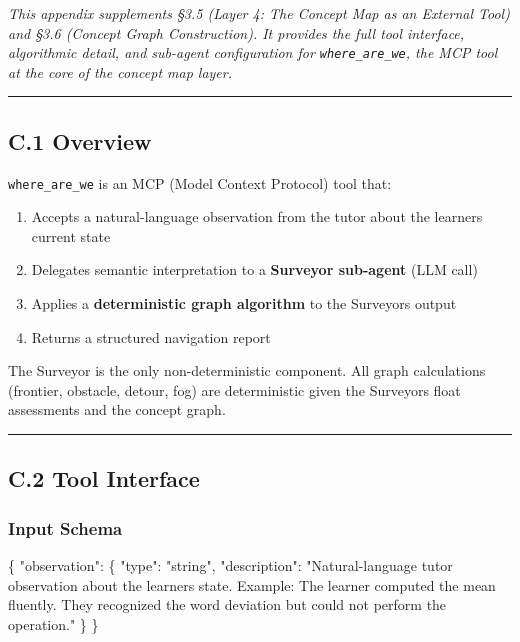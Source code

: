\documentclass[
]{article}
\newenvironment{Shaded}{}{}
\newcommand{\DataTypeTok}[1]{\textcolor[rgb]{0.56,0.13,0.00}{#1}}
\newcommand{\FunctionTok}[1]{\textcolor[rgb]{0.02,0.16,0.49}{#1}}
\newcommand{\StringTok}[1]{\textcolor[rgb]{0.25,0.44,0.63}{#1}}
\providecommand{\tightlist}{%
  \setlength{\itemsep}{0pt}\setlength{\parskip}{0pt}}
\begin{document}
\emph{This appendix supplements §3.5 (Layer 4: The Concept Map as an External Tool) and §3.6 (Concept Graph Construction). It provides the full tool interface, algorithmic detail, and sub-agent configuration for \texttt{where\_are\_we}, the MCP tool at the core of the concept map layer.}

\begin{center}\rule{0.5\linewidth}{0.5pt}\end{center}

\subsection{C.1 Overview}\label{c1-overview}

\texttt{where\_are\_we} is an MCP (Model Context Protocol) tool that:

\begin{enumerate}
\def\labelenumi{\arabic{enumi}.}
\tightlist
\item
  Accepts a natural-language observation from the tutor about the learner\textquotesingle s current state
\item
  Delegates semantic interpretation to a \textbf{Surveyor sub-agent} (LLM call)
\item
  Applies a \textbf{deterministic graph algorithm} to the Surveyor\textquotesingle s output
\item
  Returns a structured navigation report
\end{enumerate}

The Surveyor is the only non-deterministic component. All graph calculations (frontier, obstacle, detour, fog) are deterministic given the Surveyor\textquotesingle s float assessments and the concept graph.

\begin{center}\rule{0.5\linewidth}{0.5pt}\end{center}

\subsection{C.2 Tool Interface}\label{c2-tool-interface}

\subsubsection{Input Schema}\label{input-schema}

\begin{Shaded}
\begin{Highlighting}[]
\FunctionTok{\{}
  \DataTypeTok{"observation"}\FunctionTok{:} \FunctionTok{\{}
    \DataTypeTok{"type"}\FunctionTok{:} \StringTok{"string"}\FunctionTok{,}
    \DataTypeTok{"description"}\FunctionTok{:} \StringTok{"Natural{-}language tutor observation about the learner\textquotesingle{}s state. Example: \textquotesingle{}The learner computed the mean fluently. They recognized the word deviation but could not perform the operation.\textquotesingle{}"}
  \FunctionTok{\}}
\FunctionTok{\}}
\end{Highlighting}
\end{Shaded}
\end{document}
